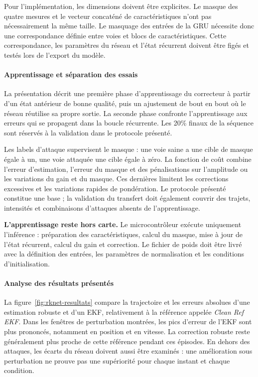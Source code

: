 \documentclass[11pt,a4paper]{article}
\renewcommand{\strong}[1]{\textbf{#1}}
\begin{document}
Pour l'implémentation, les dimensions doivent être explicites. Le masque des quatre mesures et le vecteur concaténé de caractéristiques n'ont pas nécessairement la même taille. Le masquage des entrées de la GRU nécessite donc une correspondance définie entre voies et blocs de caractéristiques. Cette correspondance, les paramètres du réseau et l'état récurrent doivent être figés et testés lors de l'export du modèle.

\paragraph{Apprentissage et séparation des essais}
La présentation décrit une première phase d'apprentissage du correcteur à partir d'un état antérieur de bonne qualité, puis un ajustement de bout en bout où le réseau réutilise sa propre sortie. La seconde phase confronte l'apprentissage aux erreurs qui se propagent dans la boucle récurrente. Les 20\% finaux de la séquence sont réservés à la validation dans le protocole présenté.

Les labels d'attaque supervisent le masque : une voie saine a une cible de masque égale à un, une voie attaquée une cible égale à zéro. La fonction de coût combine l'erreur d'estimation, l'erreur du masque et des pénalisations sur l'amplitude ou les variations du gain et du masque. Ces dernières limitent les corrections excessives et les variations rapides de pondération. Le protocole présenté constitue une base ; la validation du transfert doit également couvrir des trajets, intensités et combinaisons d'attaques absents de l'apprentissage.

\strong{L'apprentissage reste hors carte.} Le microcontrôleur exécute uniquement l'inférence : préparation des caractéristiques, calcul du masque, mise à jour de l'état récurrent, calcul du gain et correction. Le fichier de poids doit être livré avec la définition des entrées, les paramètres de normalisation et les conditions d'initialisation.

\paragraph{Analyse des résultats présentés}
La figure~\ref{fig:rknet-resultats} compare la trajectoire et les erreurs absolues d'une estimation robuste et d'un EKF, relativement à la référence appelée \emph{Clean Ref EKF}. Dans les fenêtres de perturbation montrées, les pics d'erreur de l'EKF sont plus prononcés, notamment en position et en vitesse. La correction robuste reste généralement plus proche de cette référence pendant ces épisodes. En dehors des attaques, les écarts du réseau doivent aussi être examinés : une amélioration sous perturbation ne prouve pas une supériorité pour chaque instant et chaque condition.
\end{document}
